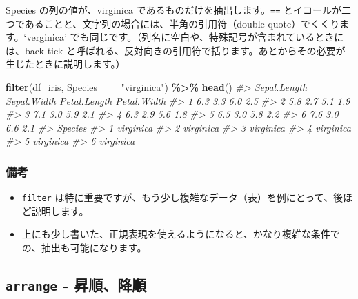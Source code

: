\documentclass[
  xelatex, ja=standard]{bxjsbook}
\newenvironment{Shaded}{\begin{snugshade}}{\end{snugshade}}
\newcommand{\CommentTok}[1]{\textcolor[rgb]{0.56,0.35,0.01}{\textit{#1}}}
\newcommand{\FunctionTok}[1]{\textcolor[rgb]{0.13,0.29,0.53}{\textbf{#1}}}
\newcommand{\NormalTok}[1]{#1}
\newcommand{\SpecialCharTok}[1]{\textcolor[rgb]{0.81,0.36,0.00}{\textbf{#1}}}
\newcommand{\StringTok}[1]{\textcolor[rgb]{0.31,0.60,0.02}{#1}}
\theoremstyle{definition}
\theoremstyle{definition}
\theoremstyle{definition}
\theoremstyle{definition}
\theoremstyle{remark}
\begin{document}
Species の列の値が、virginica であるものだけを抽出します。\texttt{==} とイコールが二つであることと、文字列の場合には、半角の引用符（double quote）でくくります。`verginica' でも同じです。（列名に空白や、特殊記号が含まれているときには、back tick と呼ばれる、反対向きの引用符で括ります。あとからその必要が生じたときに説明します。）

\begin{Shaded}
\begin{Highlighting}[]
\FunctionTok{filter}\NormalTok{(df\_iris, Species }\SpecialCharTok{==} \StringTok{"virginica"}\NormalTok{) }\SpecialCharTok{\%\textgreater{}\%} \FunctionTok{head}\NormalTok{()}
\CommentTok{\#\textgreater{}   Sepal.Length Sepal.Width Petal.Length Petal.Width}
\CommentTok{\#\textgreater{} 1          6.3         3.3          6.0         2.5}
\CommentTok{\#\textgreater{} 2          5.8         2.7          5.1         1.9}
\CommentTok{\#\textgreater{} 3          7.1         3.0          5.9         2.1}
\CommentTok{\#\textgreater{} 4          6.3         2.9          5.6         1.8}
\CommentTok{\#\textgreater{} 5          6.5         3.0          5.8         2.2}
\CommentTok{\#\textgreater{} 6          7.6         3.0          6.6         2.1}
\CommentTok{\#\textgreater{}     Species}
\CommentTok{\#\textgreater{} 1 virginica}
\CommentTok{\#\textgreater{} 2 virginica}
\CommentTok{\#\textgreater{} 3 virginica}
\CommentTok{\#\textgreater{} 4 virginica}
\CommentTok{\#\textgreater{} 5 virginica}
\CommentTok{\#\textgreater{} 6 virginica}
\end{Highlighting}
\end{Shaded}

\hypertarget{ux5099ux8003-4}{%
\subsubsection{備考　}\label{ux5099ux8003-4}}

\begin{itemize}
\item
  \texttt{filter} は特に重要ですが、もう少し複雑なデータ（表）を例にとって、後ほど説明します。
\item
  上にも少し書いた、正規表現を使えるようになると、かなり複雑な条件での、抽出も可能になります。
\end{itemize}

\hypertarget{arrange---ux6607ux9806ux964dux9806}{%
\subsection{\texorpdfstring{\texttt{arrange} - 昇順、降順}{arrange - 昇順、降順}}\label{arrange---ux6607ux9806ux964dux9806}}
\end{document}
